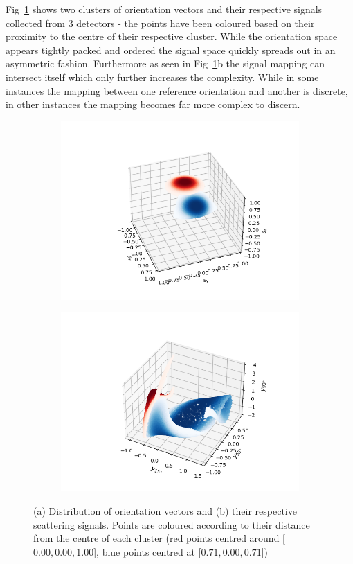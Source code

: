 Fig~\ref{fig:mixing} shows two clusters of orientation 
vectors and their respective signals collected from 3 detectors
- the points have been coloured based on their proximity 
to the centre of their respective cluster. While the 
orientation space appears tightly packed and ordered the 
signal space quickly spreads out in an asymmetric fashion. 
Furthermore as seen in Fig~\ref{fig:mixing}b the signal 
mapping can intersect itself which only further increases 
the complexity. While in some instances the mapping between 
one reference orientation and another is discrete, in other 
instances the mapping becomes far more complex to discern.
\newpage 
\begin{figure}[h!]
	\centering
	\begin{subfigure}{0.8\textwidth}
		\subcaption{}
		\includegraphics[width=\textwidth]{fig3a.png}
	\end{subfigure}
	\begin{subfigure}{0.8\textwidth}
		\subcaption{}
		\includegraphics[width=\textwidth]{fig3b.png}
	\end{subfigure}
	\caption{(a) Distribution of orientation vectors and (b) their respective scattering signals. Points are coloured according to their distance from the centre of each cluster (red points centred around [$0.00, 0.00, 1.00$], blue points centred at [$0.71, 0.00, 0.71$])}
	\label{fig:mixing}
\end{figure}
